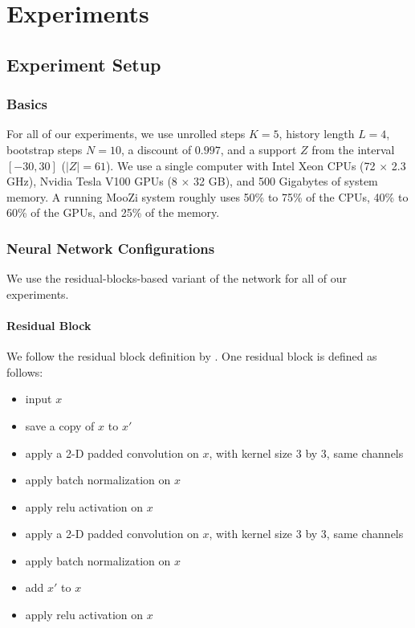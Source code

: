 \chapter{Experiments}
\section{Experiment Setup}
\subsection{Basics}
For all of our experiments, we use unrolled steps $K = 5$, history length $L = 4$, bootstrap steps $N = 10$, a discount of $0.997$, and a support $Z$ from the interval  $[-30, 30]$ ($|Z| = 61$).
We use a single computer with Intel Xeon CPUs (72 $\times$ 2.3 GHz), Nvidia Tesla V100 GPUs (8 $\times$ 32 GB), and 500 Gigabytes of system memory.
A running MooZi system roughly uses 50\% to 75\% of the CPUs, 40\% to 60\% of the GPUs, and 25\% of the memory.

\subsection{Neural Network Configurations}
We use the residual-blocks-based variant of the network for all of our experiments.

\subsubsection{Residual Block}
We follow the residual block definition by \citeauthor{DeepResidualLearning_He.Zhang.ea_2016} \cite{DeepResidualLearning_He.Zhang.ea_2016}.
One residual block is defined as follows:
\begin{itemize}
    \item input $x$
    \item save a copy of $x$ to $x'$
    \item apply a 2-D padded convolution on $x$, with kernel size 3 by 3, same channels
    \item apply batch normalization on $x$
    \item apply relu activation on $x$
    \item apply a 2-D padded convolution on $x$, with kernel size 3 by 3, same channels
    \item apply batch normalization on $x$
    \item add $x'$ to $x$
    \item apply relu activation on $x$
\end{itemize}


